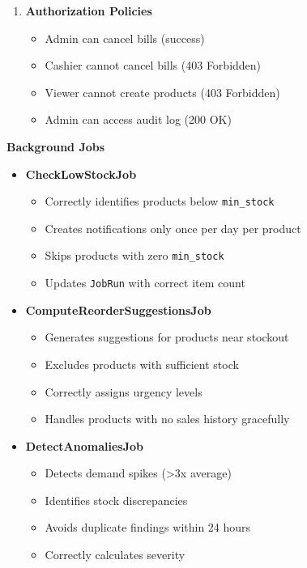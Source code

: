 \begin{enumerate}[leftmargin=*]
    \item \textbf{Authorization Policies}
    \begin{itemize}
        \item Admin can cancel bills (success)
        \item Cashier cannot cancel bills (403 Forbidden)
        \item Viewer cannot create products (403 Forbidden)
        \item Admin can access audit log (200 OK)
    \end{itemize}
\end{enumerate}

\textbf{Background Jobs}

\begin{itemize}
    \item \textbf{CheckLowStockJob}
    \begin{itemize}
        \item Correctly identifies products below \texttt{min\_stock}
        \item Creates notifications only once per day per product
        \item Skips products with zero \texttt{min\_stock}
        \item Updates \texttt{JobRun} with correct item count
    \end{itemize}
    
    \item \textbf{ComputeReorderSuggestionsJob}
    \begin{itemize}
        \item Generates suggestions for products near stockout
        \item Excludes products with sufficient stock
        \item Correctly assigns urgency levels
        \item Handles products with no sales history gracefully
    \end{itemize}
    
    \item \textbf{DetectAnomaliesJob}
    \begin{itemize}
        \item Detects demand spikes (>3x average)
        \item Identifies stock discrepancies
        \item Avoids duplicate findings within 24 hours
        \item Correctly calculates severity
    \end{itemize}
\end{itemize}

